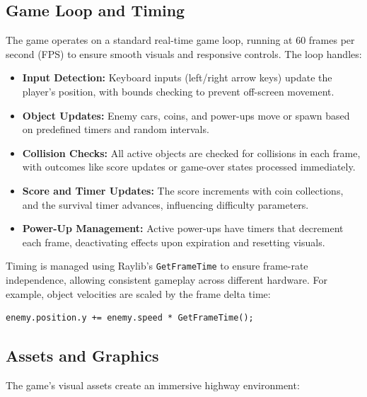 \documentclass[12pt,a4paper]{article}
\begin{document}
\subsection{Game Loop and Timing}

The game operates on a standard real-time game loop, running at 60 frames per second (FPS) to ensure smooth visuals and responsive controls. The loop handles: \\

\begin{itemize}
    \item \textbf{Input Detection:} Keyboard inputs (left/right arrow keys) update the player’s position, with bounds checking to prevent off-screen movement. \\
    \item \textbf{Object Updates:} Enemy cars, coins, and power-ups move or spawn based on predefined timers and random intervals. \\
    \item \textbf{Collision Checks:} All active objects are checked for collisions in each frame, with outcomes like score updates or game-over states processed immediately. \\
    \item \textbf{Score and Timer Updates:} The score increments with coin collections, and the survival timer advances, influencing difficulty parameters. \\
    \item \textbf{Power-Up Management:} Active power-ups have timers that decrement each frame, deactivating effects upon expiration and resetting visuals. \\
\end{itemize}

Timing is managed using Raylib’s \texttt{GetFrameTime} to ensure frame-rate independence, allowing consistent gameplay across different hardware. For example, object velocities are scaled by the frame delta time: \\

\begin{verbatim}
enemy.position.y += enemy.speed * GetFrameTime();
\end{verbatim}

\subsection{Assets and Graphics}

The game’s visual assets create an immersive highway environment: \\
\end{document}
